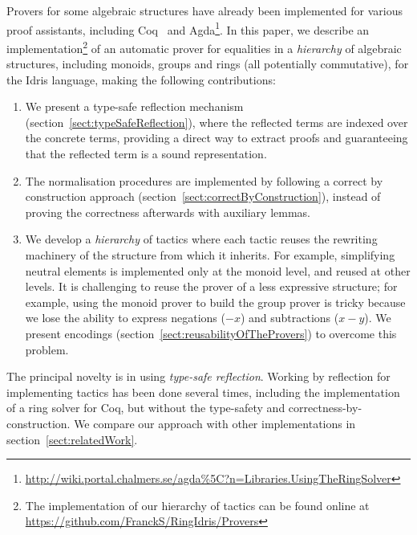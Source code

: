 Provers for some algebraic structures have already been implemented for various
proof assistants, including Coq~\cite{Coq2005} and
Agda\footnote{\url{http://wiki.portal.chalmers.se/agda\%5C?n=Libraries.UsingTheRingSolver}}. 
In this paper, we describe an implementation\footnote{The
implementation of our hierarchy of tactics can be found online at
\url{https://github.com/FranckS/RingIdris/Provers}} of an automatic prover for
equalities in a \emph{hierarchy} of algebraic structures, including monoids,
groups and rings (all potentially commutative), for the Idris language,
making the following contributions:

\begin{enumerate}

\item We present a type-safe reflection mechanism
(section~\ref{sect:typeSafeReflection}), where the reflected terms are indexed
over the concrete terms, providing a direct way to extract proofs and
guaranteeing that the reflected term is a sound representation.

\item The normalisation procedures are implemented by following a correct by
construction approach (section~\ref{sect:correctByConstruction}), instead of proving the correctness afterwards with
auxiliary lemmas. 

\item We develop a \emph{hierarchy} of tactics where each tactic reuses the
rewriting machinery of the structure from which it inherits.  For
example, simplifying neutral elements is implemented only at the monoid level,
and reused at other levels.
It is challenging
to reuse the prover of a less expressive structure; for
example, using the monoid prover to build the group prover is 
tricky because
we lose the ability to express negations ($-x$) and
subtractions ($x-y$). We present encodings
(section~\ref{sect:reusabilityOfTheProvers}) to overcome this problem.

\end{enumerate}

The principal novelty is in using 
\emph{type-safe reflection}.  Working by reflection for implementing tactics
has been done several times, including the implementation of a ring solver
for Coq, but without the type-safety and
correctness-by-construction. We compare our approach with other
implementations in section~\ref{sect:relatedWork}.



